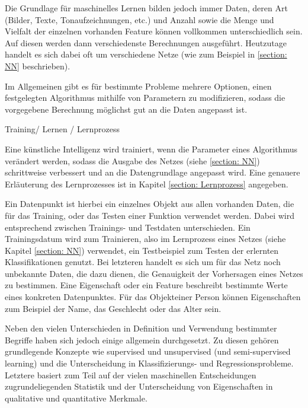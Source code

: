 Die Grundlage für maschinelles Lernen bilden jedoch immer Daten, deren Art (Bilder, Texte, Tonaufzeichnungen, etc.) und Anzahl sowie die Menge und Vielfalt der einzelnen vorhanden Feature können vollkommen unterschiedlich sein. Auf diesen werden dann verschiedenste Berechnungen ausgeführt. Heutzutage handelt es sich dabei oft um verschiedene Netze (wie zum Beispiel in \ref{section: NN} beschrieben).

Im Allgemeinen gibt es für bestimmte Probleme mehrere Optionen, einen festgelegten Algorithmus mithilfe von Parametern zu modifizieren, sodass die vorgegebene Berechnung möglichst gut an die Daten angepasst ist. 

\begin{definition}
	\label{def: Training}
	Training/ Lernen / Lernprozess
	
	Eine künstliche Intelligenz wird trainiert, wenn die Parameter eines Algorithmus verändert werden, sodass die Ausgabe des Netzes (siehe \ref{section: NN}) schrittweise verbessert und an die Datengrundlage angepasst wird. \cite{Basics-ML-Blog} 
	Eine genauere Erläuterung des Lernprozesses ist in Kapitel \ref{section: Lernprozess} angegeben.
\end{definition}

Ein Datenpunkt ist hierbei ein einzelnes Objekt aus allen vorhanden Daten, die für das Training, oder das Testen einer Funktion verwendet werden. Dabei wird entsprechend zwischen Trainings- und Testdaten unterschieden. \cite{}  Ein Trainingsdatum wird zum Trainieren, also im Lernprozess eines Netzes (siehe Kapitel \ref{section: NN}) verwendet,  \cite{Basics-Training-Daten-ehler-CrossValidation} ein Testbeispiel zum Testen der erlernten Klassifikationen genutzt. Bei letzteren handelt es sich um für das Netz noch unbekannte Daten, die dazu dienen, die Genauigkeit der Vorhersagen eines Netzes zu bestimmen. \cite{Basics-Training-Daten-ehler-CrossValidation} 
Eine Eigenschaft oder ein Feature beschreibt bestimmte Werte eines konkreten Datenpunktes. Für das \glqq Objekt\grqq einer Person können Eigenschaften zum Beispiel der Name, das Geschlecht oder das Alter sein. \cite{} 	

Neben den vielen Unterschieden in Definition und Verwendung bestimmter Begriffe haben sich jedoch einige allgemein durchgesetzt. Zu diesen gehören grundlegende Konzepte wie supervised und unsupervised (und semi-supervised learning) und die Unterscheidung in Klassifizierungs- und Regressionsprobleme. Letztere basiert zum Teil auf der vielen maschinellen Entscheidungen zugrundeliegenden Statistik und der Unterscheidung von Eigenschaften in qualitative und quantitative Merkmale.

